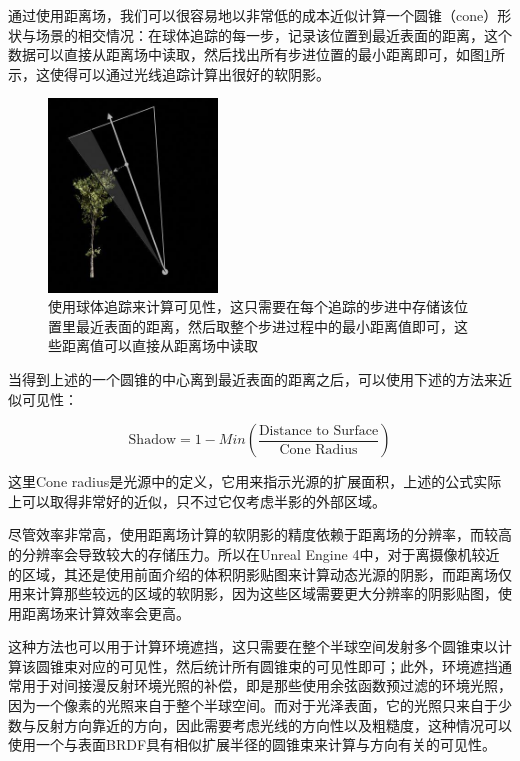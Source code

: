 通过使用距离场，我们可以很容易地以非常低的成本近似计算一个圆锥（cone）形状与场景的相交情况：在球体追踪的每一步，记录该位置到最近表面的距离，这个数据可以直接从距离场中读取，然后找出所有步进位置的最小距离即可，如图\ref{f:ConeTrace}所示，这使得可以通过光线追踪计算出很好的软阴影。

\begin{figure}
\sidecaption
	\includegraphics[width=0.4\textwidth]{graphics/shadows/ConeTrace}
	\caption{使用球体追踪来计算可见性，这只需要在每个追踪的步进中存储该位置里最近表面的距离，然后取整个步进过程中的最小距离值即可，这些距离值可以直接从距离场中读取}
	\label{f:ConeTrace}
\end{figure}

当得到上述的一个圆锥的中心离到最近表面的距离之后，可以使用下述的方法来近似可见性：

\begin{equation}
	\text{Shadow}=1-Min(\frac{\text{Distance to Surface}}{\text{Cone Radius}})
\end{equation}

这里Cone radius是光源中的定义，它用来指示光源的扩展面积，上述的公式实际上可以取得非常好的近似，只不过它仅考虑半影的外部区域。

尽管效率非常高，使用距离场计算的软阴影的精度依赖于距离场的分辨率，而较高的分辨率会导致较大的存储压力。所以在Unreal Engine 4中，对于离摄像机较近的区域，其还是使用前面介绍的体积阴影贴图来计算动态光源的阴影，而距离场仅用来计算那些较远的区域的软阴影，因为这些区域需要更大分辨率的阴影贴图，使用距离场来计算效率会更高。

这种方法也可以用于计算环境遮挡，这只需要在整个半球空间发射多个圆锥束以计算该圆锥束对应的可见性，然后统计所有圆锥束的可见性即可；此外，环境遮挡通常用于对间接漫反射环境光照的补偿，即是那些使用余弦函数预过滤的环境光照，因为一个像素的光照来自于整个半球空间。而对于光泽表面，它的光照只来自于少数与反射方向靠近的方向，因此需要考虑光线的方向性以及粗糙度，这种情况可以使用一个与表面BRDF具有相似扩展半径的圆锥束来计算与方向有关的可见性。

